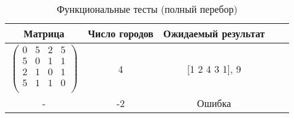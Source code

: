 \begin{center}
    \captionsetup{justification=raggedright,singlelinecheck=off}
    \begin{longtable}[c]{|c|c|c|c|c|}
    \caption{Функциональные тесты (полный перебор)\label{tbl:func_test_brute}} \\ \hline
		Матрица & Число городов & Ожидаемый результат \\
		\hline
		$ \begin{pmatrix}
			0 & 5 & 2 & 5 \\
			5 & 0 & 1 & 1 \\
			2 & 1 & 0 & 1 \\
			5 & 1 & 1 & 0 \\
		\end{pmatrix}$ &
		4 &
		[1 2 4 3 1], 9 \\
		\hline
		- &
		-2 &
		Ошибка \\
		\hline
	\end{longtable}
\end{center}
\clearpage

